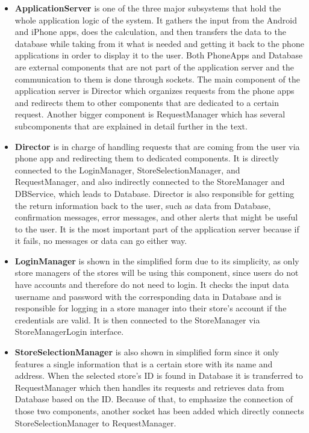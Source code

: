 \begin{itemize}
\item \textbf{ApplicationServer} is one of the three major subsystems that hold the whole application logic of the system. It gathers the input from the Android and iPhone apps, does the calculation, and then transfers the data to the database while taking from it what is needed and getting it back to the phone applications in order to display it to the user. Both PhoneApps and Database are external components that are not part of the application server and the communication to them is done through sockets. The main component of the application server is Director which organizes requests from the phone apps and redirects them to other components that are dedicated to a certain request. Another bigger component is RequestManager which has several subcomponents that are explained in detail further in the text.  

\item \textbf{Director} is in charge of handling requests that are coming from the user via phone app and redirecting them to dedicated components. It is directly connected to the LoginManager, StoreSelectionManager, and RequestManager, and also indirectly connected to the StoreManager and DBService, which leads to Database. Director is also responsible for getting the return information back to the user, such as data from Database, confirmation messages, error messages, and other alerts that might be useful to the user. It is the most important part of the application server because if it fails, no messages or data can go either way.  

\item \textbf{LoginManager} is shown in the simplified form due to its simplicity, as only store managers of the stores will be using this component, since users do not have accounts and therefore do not need to login. It checks the input data username and password with the corresponding data in Database and is responsible for logging in a store manager into their store's account if the credentials are valid. It is then connected to the StoreManager via StoreManagerLogin interface. 

\item \textbf{StoreSelectionManager} is also shown in simplified form since it only features a single information that is a certain store with its name and address. When the selected store's ID is found in Database it is transferred to RequestManager which then handles its requests and retrieves data from Database based on the ID. Because of that, to emphasize the connection of those two components, another socket has been added which directly connects StoreSelectionManager to RequestManager.  


\end{itemize}
